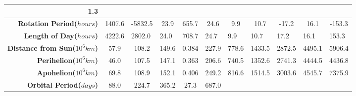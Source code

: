 \begin{landscape}
\begin{table}[H]
\begin{tabular}{|r|c|c|c|c|c|c|c|c|c|c|}
  \cellcolor[HTML]{FFFFFF}1.3 \\ \hline
\textbf{Rotation Period($hours$)} &
  \cellcolor[HTML]{F5F5F5}1407.6 &
  \cellcolor[HTML]{FFFFFF}-5832.5 &
  \cellcolor[HTML]{F5F5F5}23.9 &
  \cellcolor[HTML]{FFFFFF}655.7 &
  \cellcolor[HTML]{F5F5F5}24.6 &
  \cellcolor[HTML]{FFFFFF}9.9 &
  \cellcolor[HTML]{F5F5F5}10.7 &
  \cellcolor[HTML]{FFFFFF}-17.2 &
  \cellcolor[HTML]{F5F5F5}16.1 &
  \cellcolor[HTML]{FFFFFF}-153.3 \\ \hline
\textbf{Length of Day($hours$)} &
  \multicolumn{1}{l|}{\cellcolor[HTML]{F5F5F5}4222.6} &
  \multicolumn{1}{l|}{\cellcolor[HTML]{FFFFFF}2802.0} &
  \multicolumn{1}{l|}{\cellcolor[HTML]{F5F5F5}24.0} &
  \multicolumn{1}{l|}{\cellcolor[HTML]{FFFFFF}708.7} &
  \multicolumn{1}{l|}{\cellcolor[HTML]{F5F5F5}24.7} &
  \multicolumn{1}{l|}{\cellcolor[HTML]{FFFFFF}9.9} &
  \multicolumn{1}{l|}{\cellcolor[HTML]{F5F5F5}10.7} &
  \multicolumn{1}{l|}{\cellcolor[HTML]{FFFFFF}17.2} &
  \multicolumn{1}{l|}{\cellcolor[HTML]{F5F5F5}16.1} &
  \multicolumn{1}{l|}{\cellcolor[HTML]{FFFFFF}153.3} \\ \hline
\textbf{Distance from Sun($10^6km$)} &
  \cellcolor[HTML]{F5F5F5}57.9 &
  \cellcolor[HTML]{FFFFFF}108.2 &
  \cellcolor[HTML]{F5F5F5}149.6 &
  \cellcolor[HTML]{FFFFFF}0.384 &
  \cellcolor[HTML]{F5F5F5}227.9 &
  \cellcolor[HTML]{FFFFFF}778.6 &
  \cellcolor[HTML]{F5F5F5}1433.5 &
  \cellcolor[HTML]{FFFFFF}2872.5 &
  \cellcolor[HTML]{F5F5F5}4495.1 &
  \cellcolor[HTML]{FFFFFF}5906.4 \\ \hline
\textbf{Perihelion($10^6km$)} &
  \cellcolor[HTML]{F5F5F5}46.0 &
  \cellcolor[HTML]{FFFFFF}107.5 &
  \cellcolor[HTML]{F5F5F5}147.1 &
  \cellcolor[HTML]{FFFFFF}0.363 &
  \cellcolor[HTML]{F5F5F5}206.6 &
  \cellcolor[HTML]{FFFFFF}740.5 &
  \cellcolor[HTML]{F5F5F5}1352.6 &
  \cellcolor[HTML]{FFFFFF}2741.3 &
  \cellcolor[HTML]{F5F5F5}4444.5 &
  \cellcolor[HTML]{FFFFFF}4436.8 \\ \hline
\textbf{Apohelion($10^6km$)} &
  \cellcolor[HTML]{F5F5F5}69.8 &
  \cellcolor[HTML]{FFFFFF}108.9 &
  \cellcolor[HTML]{F5F5F5}152.1 &
  \cellcolor[HTML]{FFFFFF}0.406 &
  \cellcolor[HTML]{F5F5F5}249.2 &
  \cellcolor[HTML]{FFFFFF}816.6 &
  \cellcolor[HTML]{F5F5F5}1514.5 &
  \cellcolor[HTML]{FFFFFF}3003.6 &
  \cellcolor[HTML]{F5F5F5}4545.7 &
  \cellcolor[HTML]{FFFFFF}7375.9 \\ \hline
\textbf{Orbital Period($days$)} &
  \cellcolor[HTML]{F5F5F5}88.0 &
  \cellcolor[HTML]{FFFFFF}224.7 &
  \cellcolor[HTML]{F5F5F5}365.2 &
  \cellcolor[HTML]{FFFFFF}27.3 &
  \cellcolor[HTML]{F5F5F5}687.0 &

\end{tabular}
\end{table}
\end{landscape}
